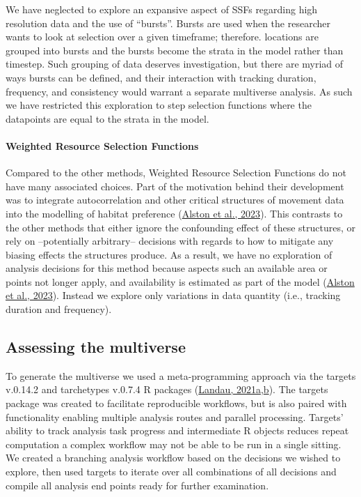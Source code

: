 \documentclass[10pt,a4paper]{article}
\begin{document}
We have neglected to explore an expansive aspect of SSFs regarding high resolution data and the use of ``bursts''.
Bursts are used when the researcher wants to look at selection over a given timeframe; therefore. locations are grouped into bursts and the bursts become the strata in the model rather than timestep.
Such grouping of data deserves investigation, but there are myriad of ways bursts can be defined, and their interaction with tracking duration, frequency, and consistency would warrant a separate multiverse analysis.
As such we have restricted this exploration to step selection functions where the datapoints are equal to the strata in the model.

\hypertarget{weighted-resource-selection-functions}{%
\paragraph{Weighted Resource Selection Functions}\label{weighted-resource-selection-functions}}

Compared to the other methods, Weighted Resource Selection Functions do not have many associated choices.
Part of the motivation behind their development was to integrate autocorrelation and other critical structures of movement data into the modelling of habitat preference (\protect\hyperlink{ref-alston_mitigating_2023}{Alston et al., 2023}).
This contrasts to the other methods that either ignore the confounding effect of these structures, or rely on --potentially arbitrary-- decisions with regards to how to mitigate any biasing effects the structures produce.
As a result, we have no exploration of analysis decisions for this method because aspects such an available area or points not longer apply, and availability is estimated as part of the model (\protect\hyperlink{ref-alston_mitigating_2023}{Alston et al., 2023}).
Instead we explore only variations in data quantity (i.e., tracking duration and frequency).

\hypertarget{assessing-the-multiverse}{%
\subsection{Assessing the multiverse}\label{assessing-the-multiverse}}

To generate the multiverse we used a meta-programming approach via the targets v.0.14.2 and tarchetypes v.0.7.4 R packages (\protect\hyperlink{ref-targets}{Landau, 2021a},\protect\hyperlink{ref-tarchetypes}{b}).
The targets package was created to facilitate reproducible workflows, but is also paired with functionality enabling multiple analysis routes and parallel processing.
Targets' ability to track analysis task progress and intermediate R objects reduces repeat computation a complex workflow may not be able to be run in a single sitting.
We created a branching analysis workflow based on the decisions we wished to explore, then used targets to iterate over all combinations of all decisions and compile all analysis end points ready for further examination.
\end{document}
